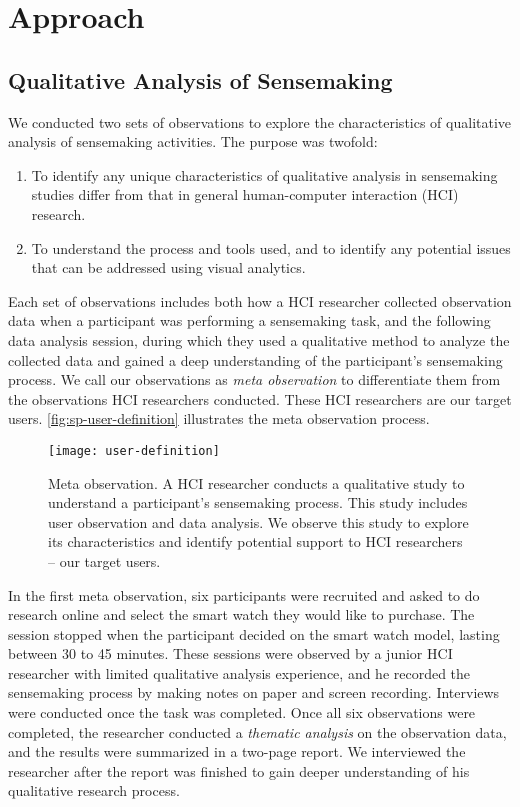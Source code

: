 \section{Approach}

\subsection{Qualitative Analysis of Sensemaking}
We conducted two sets of observations to explore the characteristics of qualitative analysis of sensemaking activities. The purpose was twofold:
\begin{enumerate}
	\item To identify any unique characteristics of qualitative analysis in sensemaking studies differ from that in general human-computer interaction (HCI) research.
	\item To understand the process and tools used, and to identify any potential issues that can be addressed using visual analytics.
\end{enumerate}

Each set of observations includes both how a HCI researcher collected observation data when a participant was performing a sensemaking task, and the following data analysis session, during which they used a qualitative method to analyze the collected data and gained a deep understanding of the participant's sensemaking process. We call our observations as \emph{meta observation} to differentiate them from the observations HCI researchers conducted. These HCI researchers are our target users. \autoref{fig:sp-user-definition} illustrates the meta observation process.

\begin{figure}[!htb]
 	\centering
 	\texttt{[image: user-definition]}
 	\caption{Meta observation. A HCI researcher conducts a qualitative study to understand a participant's sensemaking process. This study includes user observation and data analysis. We observe this study to explore its characteristics and identify potential support to HCI researchers -- our target users.}
 	\label{fig:sp-user-definition}
\end{figure}

In the first meta observation, six participants were recruited and asked to do research online and select the smart watch they would like to purchase. The session stopped when the participant decided on the smart watch model, lasting between 30 to 45 minutes. These sessions were observed by a junior HCI researcher with limited qualitative analysis experience, and he recorded the sensemaking process by making notes on paper and screen recording. Interviews were conducted once the task was completed. Once all six observations were completed, the researcher conducted a \emph{thematic analysis} on the observation data, and the results were summarized in a two-page report. We interviewed the researcher after the report was finished to gain deeper understanding of his qualitative research process.

